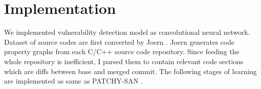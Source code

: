\section{Implementation}
\label{section:implementation}

We implemented vulnerability detection model as convolutional neural network.
Dataset of source codes are first converted by Joern \cite{yamaguchi2014modeling}.
Joern generates code property graphs from each C/C++ source code repository.
Since feeding the whole repository is inefficient, I parsed them to contain relevant code sections which are diffs between base and merged commit.
The following stages of learning are implemented as same as PATCHY-SAN \cite{niepert2016learning}.